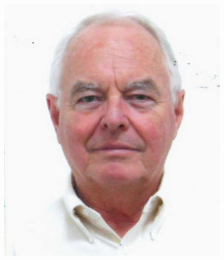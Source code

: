 \documentclass[aspectratio=169,xcolor=dvipsnames,11pt]{beamer}
\begin{document}
\begin{frame}
\begin{minipage}{0.3\linewidth}
\begin{figure}
\begin{minipage}[b]{0.6\textwidth}
    \includegraphics[width=\linewidth]{figures/rtr.jpg}
  \end{minipage}%
  \end{figure}
  \end{minipage}



%
%
%
\end{frame}
\end{document}
